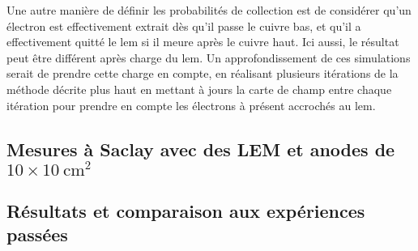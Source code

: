             Une autre manière de définir les probabilités de collection est de considérer qu'un électron est effectivement extrait dès qu'il passe le cuivre bas, et qu'il a effectivement quitté le \gls{lem} si il meure après le cuivre haut. Ici aussi, le résultat peut être différent après charge du \gls{lem}. Un approfondissement de ces simulations serait de prendre cette charge en compte, en réalisant plusieurs itérations de la méthode décrite plus haut en mettant à jours la carte de champ entre chaque itération pour prendre en compte les électrons à présent accrochés au \gls{lem}.\\
            
            
            
        \subsection{Mesures à Saclay avec des LEM et anodes de $10\times\SI{10}{\cm\squared}$ }
        
        \subsection{Résultats et comparaison aux expériences passées}